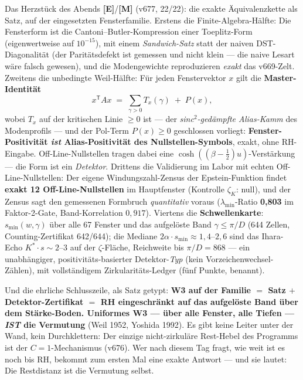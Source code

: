 \documentclass[11pt,a4paper]{article}
\newcommand{\E}{\textcolor{gut}{\textbf{[E]}}}
\newcommand{\M}{\textcolor{mess}{\textbf{[M]}}}
\begin{document}
Das Herzstück des Abends \E{}/\M{} (v677, 22/22): die exakte
Äquivalenzkette als Satz, auf der eingesetzten Fensterfamilie.
Erstens die Finite-Algebra-Hälfte: Die Fensterform ist die
Cantoni--Butler-Kompression einer Toeplitz-Form
(eigenwertweise auf $10^{-15}$), mit einem \emph{Sandwich-Satz}
statt der naiven DST-Diagonalität (der Paritätsdefekt ist gemessen
und nicht klein --- die naive Lesart wäre falsch gewesen), und die
Modengewichte reproduzieren \emph{exakt} das v669-Zelt. Zweitens
die unbedingte Weil-Hälfte: Für jeden Fenstervektor $x$ gilt die
\textbf{Master-Identität}
\[
x^{\mathsf T} A x \;=\; \sum_{\gamma > 0} T_x(\gamma) \;+\; P(x),
\]
wobei $T_x$ auf der kritischen Linie $\ge 0$ ist --- der
\emph{sinc$^2$-gedämpfte Alias-Kamm} des Modenprofils --- und der
Pol-Term $P(x) \ge 0$ geschlossen vorliegt:
\textbf{Fenster-Positivität \emph{ist} Alias-Positivität des
Nullstellen-Symbols}, exakt, ohne RH-Eingabe. Off-Line-Nullstellen
tragen dabei eine $\cosh((\beta - \tfrac12)u)$-Verstärkung --- die
Form ist ein \emph{Detektor}. Drittens die Validierung im Labor mit
echten Off-Line-Nullstellen: Der eigene Windungszahl-Zensus der
Epstein-Funktion findet \textbf{exakt 12 Off-Line-Nullstellen} im
Hauptfenster (Kontrolle $\zeta_K$: null), und der Zensus sagt den
gemessenen Formbruch \emph{quantitativ} voraus
($\lambda_{\min}$-Ratio \textbf{0{,}803} im Faktor-2-Gate,
Band-Korrelation $0{,}917$). Viertens die \textbf{Schwellenkarte}:
$s_{\min}(w, \gamma)$ über alle 67 Fenster und das aufgelöste Band
$\gamma \le \pi/D$ (644 Zellen, Counting-Zertifikat 642/644);
die Mediane $2\alpha \cdot s_{\min} \approx 1{,}4$--$2{,}6$ sind
das Ihara-Echo $K^* \cdot s \sim 2$--$3$ auf der $\zeta$-Fläche,
Reichweite bis $\pi/D = 868$ --- ein unabhängiger,
positivitäts-basierter Detektor-\emph{Typ} (kein
Vorzeichenwechsel-Zählen), mit vollständigem Zirkularitäts-Ledger
(fünf Punkte, benannt).

Und die ehrliche Schlusszeile, als Satz getypt: \textbf{W3 auf der
Familie $=$ Satz $+$ Detektor-Zertifikat $=$ \glqq{}RH eingeschränkt
auf das aufgelöste Band über dem Stärke-Boden\grqq{}. Uniformes W3
--- über alle Fenster, alle Tiefen --- \emph{IST} die Vermutung}
(Weil 1952, Yoshida 1992). Es gibt keine Leiter unter der Wand,
kein Durchklettern: Der einzige nicht-zirkuläre Rest-Hebel des
Programms ist der $C = 1$-Mechanismus (v676). Wer nach diesem Tag
fragt, \glqq{}wie weit ist es noch bis RH\grqq{}, bekommt zum
ersten Mal eine exakte Antwort --- und sie lautet: Die Restdistanz
ist die Vermutung selbst.
\end{document}
